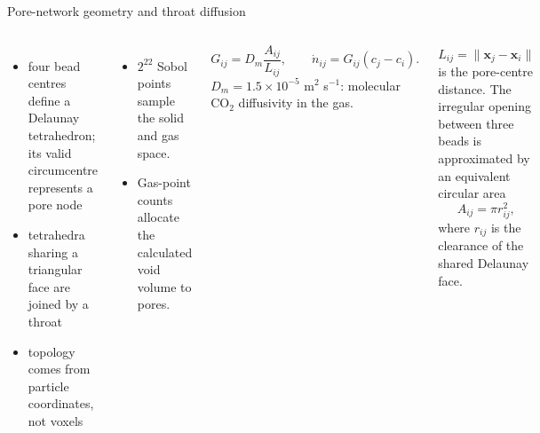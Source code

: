\begin{frame}{Pore-network geometry and throat diffusion}
\setlength{\abovedisplayskip}{5pt}\setlength{\belowdisplayskip}{5pt}
  \begin{columns}[T,onlytextwidth]
      \footnotesize
      \begin{itemize}\setlength{\itemsep}{1pt}\setlength{\parskip}{0pt}
        \item four bead centres define a Delaunay tetrahedron; its valid circumcentre represents a pore node
        \item tetrahedra sharing a triangular face are joined by a throat
        \item topology comes from particle coordinates, not voxels
      \end{itemize}
      \vspace{0.12cm}
      \begin{itemize}\setlength{\itemsep}{1pt}\setlength{\parskip}{0pt}
        \item $2^{22}$ Sobol points sample the solid and gas space.
        \item Gas-point counts allocate the calculated void volume to pores.
      \end{itemize}
      \[
        G_{ij}=D_m\frac{A_{ij}}{L_{ij}},\qquad
        \dot n_{ij}=G_{ij}(c_j-c_i).
      \]
      \footnotesize
      $D_m=1.5\times10^{-5}$ m$^2$ s$^{-1}$: molecular CO$_2$ diffusivity in the gas.
      \par\smallskip
      $L_{ij}=\lVert\mathbf{x}_j-\mathbf{x}_i\rVert$ is the pore-centre distance.
      The irregular opening between three beads is approximated by an equivalent
      circular area
      \[
        A_{ij}=\pi r_{ij}^{2},
      \]
      where $r_{ij}$ is the clearance of the shared Delaunay face.
  \end{columns}
  \vspace{0.16cm}

\end{frame}
